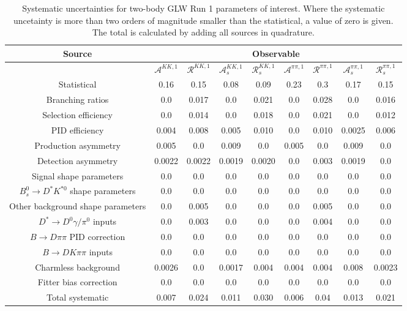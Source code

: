 \begin{sidewaystable}
  \centering
  \begin{tabular}{ccccccccc}
      \toprule
      Source & \multicolumn{8}{c}{Observable} \\
      \midrule
       & $\mathcal{A}^{KK,1}$ & $\mathcal{R}^{KK,1}$ & $\mathcal{A}_s^{KK,1}$ & $\mathcal{R}_{s}^{KK,1}$ & $\mathcal{A}^{\pi\pi,1}$ & $\mathcal{R}^{\pi\pi,1}$ & $\mathcal{A}_s^{\pi\pi,1}$ & $\mathcal{R}_{s}^{\pi\pi,1}$ \\
      \midrule
      Statistical & 0.16 & 0.15 & 0.08 & 0.09 & 0.23 & 0.3 & 0.17 & 0.15 \\
      \midrule
      Branching ratios & 0.0  & 0.017 & 0.0  & 0.021 & 0.0  & 0.028 & 0.0  & 0.016 \\
      Selection efficiency & 0.0  & 0.014 & 0.0  & 0.018 & 0.0  & 0.021 & 0.0  & 0.012 \\
      PID efficiency & 0.004 & 0.008 & 0.005 & 0.010 & 0.0  & 0.010 & 0.0025 & 0.006 \\
      Production asymmetry & 0.005 & 0.0  & 0.009 & 0.0  & 0.005 & 0.0  & 0.009 & 0.0  \\
      Detection asymmetry & 0.0022 & 0.0022 & 0.0019 & 0.0020 & 0.0  & 0.003 & 0.0019 & 0.0  \\
      Signal shape parameters & 0.0  & 0.0  & 0.0  & 0.0  & 0.0  & 0.0  & 0.0  & 0.0  \\
      $B^0_s \to D^* K^{*0}$ shape parameters & 0.0  & 0.0  & 0.0  & 0.0  & 0.0  & 0.0  & 0.0  & 0.0  \\
      Other background shape parameters & 0.0  & 0.005 & 0.0  & 0.0  & 0.0  & 0.005 & 0.0  & 0.0  \\
      $D^* \to D^0 \gamma/\pi^0$ inputs & 0.0  & 0.003 & 0.0  & 0.0  & 0.0  & 0.004 & 0.0  & 0.0  \\
      $B\to D\pi\pi$ PID correction & 0.0  & 0.0  & 0.0  & 0.0  & 0.0  & 0.0  & 0.0  & 0.0  \\
      $B\to DK\pi\pi$ inputs & 0.0  & 0.0  & 0.0  & 0.0  & 0.0  & 0.0  & 0.0  & 0.0  \\
      Charmless background & 0.0026 & 0.0  & 0.0017 & 0.004 & 0.004 & 0.004 & 0.008 & 0.0023 \\
      Fitter bias correction & 0.0  & 0.0  & 0.0  & 0.0  & 0.0  & 0.0  & 0.0  & 0.0  \\
      \midrule
      Total systematic & 0.007 & 0.024 & 0.011 & 0.030 & 0.006 & 0.04 & 0.013 & 0.021 \\
      \bottomrule
  \end{tabular}
  \caption{Systematic uncertainties for two-body GLW Run 1 parameters of interest. Where the systematic uncetainty is more than two orders of magnitude smaller than the statistical, a value of zero is given. The total is calculated by adding all sources in quadrature.}
\label{tab:twoBody_GLW_run1_systematics}
\end{sidewaystable}
